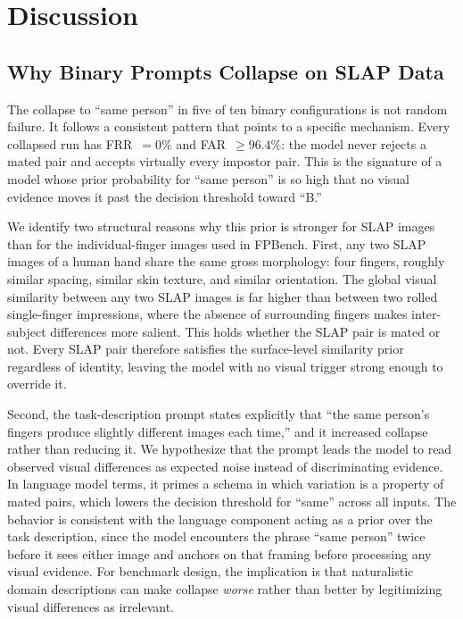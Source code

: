 \documentclass[journal]{IEEEtran}
\begin{document}
\section{Discussion}
\label{sec:discussion}

\subsection{Why Binary Prompts Collapse on SLAP Data}

The collapse to ``same person'' in five of ten binary configurations is not
random failure. It follows a consistent pattern that points to a specific
mechanism.
Every collapsed run has FRR~$= 0\%$ and FAR~$\geq 96.4\%$: the model never
rejects a mated pair and accepts virtually every impostor pair.
This is the signature of a model whose prior probability for ``same
person'' is so high that no visual evidence moves it past the decision
threshold toward ``B.''

We identify two structural reasons why this prior is stronger for SLAP
images than for the individual-finger images used in FPBench.
First, any two SLAP images of a human hand share the same gross morphology:
four fingers, roughly similar spacing, similar skin texture, and similar
orientation.
The global visual similarity between any two SLAP images is far higher than
between two rolled single-finger impressions, where the absence of
surrounding fingers makes inter-subject differences more salient. This
holds whether the SLAP pair is mated or not.
Every SLAP pair therefore satisfies the surface-level similarity prior
regardless of identity, leaving the model with no visual trigger strong
enough to override it.

Second, the task-description prompt states explicitly that ``the same
person's fingers produce slightly different images each time,'' and it
increased collapse rather than reducing it.
We hypothesize that the prompt leads the model to read observed visual
differences as expected noise instead of discriminating evidence.
In language model terms, it primes a schema in which variation is a
property of mated pairs, which lowers the decision threshold for ``same''
across all inputs.
The behavior is consistent with the language component acting as a prior
over the task description, since the model encounters the phrase ``same
person'' twice before it sees either image and anchors on that framing
before processing any visual evidence.
For benchmark design, the implication is that naturalistic domain
descriptions can make collapse \emph{worse} rather than better by
legitimizing visual differences as irrelevant.
\end{document}
